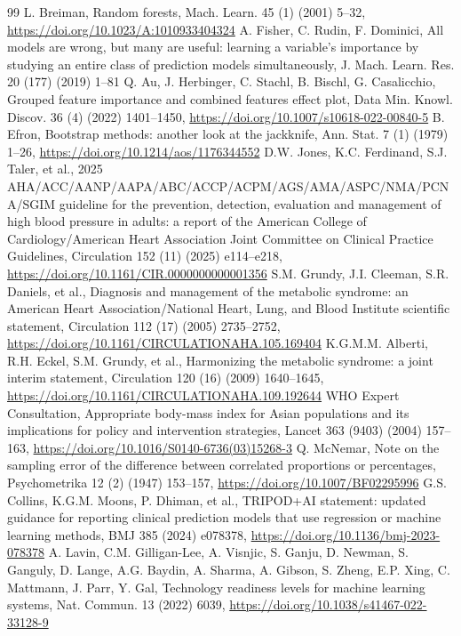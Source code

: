 \documentclass[preprint,review,12pt,times]{elsarticle}
\begin{document}
\begin{thebibliography}{99}
 L. Breiman, Random forests, Mach. Learn. 45 (1) (2001) 5–32, \url{https://doi.org/10.1023/A:1010933404324}
 A. Fisher, C. Rudin, F. Dominici, All models are wrong, but many are useful: learning a variable's importance by studying an entire class of prediction models simultaneously, J. Mach. Learn. Res. 20 (177) (2019) 1–81
 Q. Au, J. Herbinger, C. Stachl, B. Bischl, G. Casalicchio, Grouped feature importance and combined features effect plot, Data Min. Knowl. Discov. 36 (4) (2022) 1401–1450, \url{https://doi.org/10.1007/s10618-022-00840-5}
 B. Efron, Bootstrap methods: another look at the jackknife, Ann. Stat. 7 (1) (1979) 1–26, \url{https://doi.org/10.1214/aos/1176344552}
 D.W. Jones, K.C. Ferdinand, S.J. Taler, et al., 2025 AHA/\allowbreak{}ACC/\allowbreak{}AANP/\allowbreak{}AAPA/\allowbreak{}ABC/\allowbreak{}ACCP/\allowbreak{}ACPM/\allowbreak{}AGS/\allowbreak{}AMA/\allowbreak{}ASPC/\allowbreak{}NMA/\allowbreak{}PCNA/\allowbreak{}SGIM guideline for the prevention, detection, evaluation and management of high blood pressure in adults: a report of the American College of Cardiology/\allowbreak{}American Heart Association Joint Committee on Clinical Practice Guidelines, Circulation 152 (11) (2025) e114–e218, \url{https://doi.org/10.1161/CIR.0000000000001356}
 S.M. Grundy, J.I. Cleeman, S.R. Daniels, et al., Diagnosis and management of the metabolic syndrome: an American Heart Association/\allowbreak{}National Heart, Lung, and Blood Institute scientific statement, Circulation 112 (17) (2005) 2735–2752, \url{https://doi.org/10.1161/CIRCULATIONAHA.105.169404}
 K.G.M.M. Alberti, R.H. Eckel, S.M. Grundy, et al., Harmonizing the metabolic syndrome: a joint interim statement, Circulation 120 (16) (2009) 1640–1645, \url{https://doi.org/10.1161/CIRCULATIONAHA.109.192644}
 WHO Expert Consultation, Appropriate body-mass index for Asian populations and its implications for policy and intervention strategies, Lancet 363 (9403) (2004) 157–163, \url{https://doi.org/10.1016/S0140-6736(03)15268-3}
 Q. McNemar, Note on the sampling error of the difference between correlated proportions or percentages, Psychometrika 12 (2) (1947) 153–157, \url{https://doi.org/10.1007/BF02295996}
 G.S. Collins, K.G.M. Moons, P. Dhiman, et al., TRIPOD+AI statement: updated guidance for reporting clinical prediction models that use regression or machine learning methods, BMJ 385 (2024) e078378, \url{https://doi.org/10.1136/bmj-2023-078378}
 A. Lavin, C.M. Gilligan-Lee, A. Visnjic, S. Ganju, D. Newman, S. Ganguly, D. Lange, A.G. Baydin, A. Sharma, A. Gibson, S. Zheng, E.P. Xing, C. Mattmann, J. Parr, Y. Gal, Technology readiness levels for machine learning systems, Nat. Commun. 13 (2022) 6039, \url{https://doi.org/10.1038/s41467-022-33128-9}

\end{thebibliography}
\end{document}
